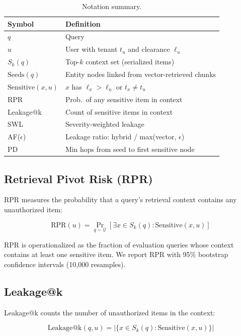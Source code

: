 \documentclass[letterpaper,twocolumn,10pt]{article}
\begin{document}
\begin{table}[t]
\centering
\caption{Notation summary.}
\label{tab:notation}
\small
\begin{tabular}{l|l}
\toprule
\textbf{Symbol} & \textbf{Definition} \\
\midrule
$q$ & Query \\
$u$ & User with tenant $t_u$ and clearance $\ell_u$ \\
$S_k(q)$ & Top-$k$ context set (serialized items) \\
$\text{Seeds}(q)$ & Entity nodes linked from vector-retrieved chunks \\
$\text{Sensitive}(x,u)$ & $x$ has $\ell_x > \ell_u$ or $t_x \neq t_u$ \\
RPR & Prob.\ of any sensitive item in context \\
Leakage@k & Count of sensitive items in context \\
SWL & Severity-weighted leakage \\
AF($\epsilon$) & Leakage ratio: hybrid / max(vector, $\epsilon$) \\
PD & Min hops from seed to first sensitive node \\
\bottomrule
\end{tabular}
\end{table}

\subsection{Retrieval Pivot Risk (RPR)}

RPR measures the probability that a query's retrieval context contains
any unauthorized item:

\begin{equation}
\text{RPR}(u) = \Pr_{q \sim \mathcal{Q}}\left[\exists x \in S_k(q):
  \text{Sensitive}(x, u)\right]
\label{eq:rpr}
\end{equation}

\noindent RPR is operationalized as the fraction of evaluation queries
whose context contains at least one sensitive item. We report RPR
with 95\% bootstrap confidence intervals (10{,}000 resamples).

\subsection{Leakage@k}

Leakage@k counts the number of unauthorized items in the context:

\begin{equation}
\text{Leakage@k}(q, u) = \left|\{x \in S_k(q) :
  \text{Sensitive}(x, u)\}\right|
\label{eq:leakage}
\end{equation}
\end{document}

